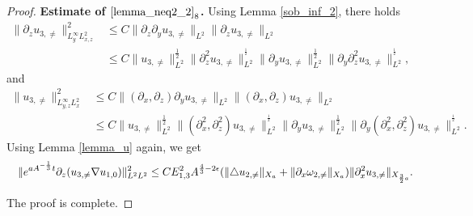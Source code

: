 \documentclass[12pt, reqno]{amsart}
\numberwithin{equation}{section}
\begin{document}
\begin{proof}
		{\bf Estimate of $\eqref{lemma_neq2_2}_8$.}
		Using Lemma \ref{sob_inf_2}, there holds
		\begin{equation*}
			\begin{aligned}
				\|\partial_zu_{3,\neq}\|^2_{L^{\infty}_yL^2_{x,z}}
				&\leq C\|\partial_z\partial_yu_{3,\neq}\|_{L^2}
				\|\partial_zu_{3,\neq}\|_{L^2}\\
				&\leq C
				\|u_{3,\neq}\|^{\frac12}_{L^2}
				\|\partial_z^2u_{3,\neq}\|^{^\frac12}_{L^2}
				\|\partial_yu_{3,\neq}\|^{\frac12}_{L^2}
				\|\partial_y\partial_z^2u_{3,\neq}\|
				^{^\frac12}_{L^2},
			\end{aligned}
		\end{equation*}
		and 
		\begin{equation*}
			\begin{aligned}
				\|u_{3,\neq}\|^2_{L^{\infty}_{y,z}L^2_x}
				&\leq C\|(\partial_x,\partial_z)\partial_yu_{3,\neq}\|_{L^2}
				\|(\partial_x,\partial_z)u_{3,\neq}\|_{L^2}\\
				&\leq C
				\|u_{3,\neq}\|^{\frac12}_{L^2}
				\|(\partial_x^2,\partial_z^2)u_{3,\neq}\|^{^\frac12}_{L^2}
				\|\partial_yu_{3,\neq}\|^{\frac12}_{L^2}
				\|\partial_y(\partial_x^2,\partial_z^2)u_{3,\neq}\|
				^{^\frac12}_{L^2}.
			\end{aligned}
		\end{equation*}
		Using  Lemma \ref{lemma_u} again, we get
		\begin{equation*}
			\begin{aligned}
				\quad\|{\rm e}^{aA^{-\frac{1}{3}}t}\partial_z
				(u_{3,\neq}\nabla u_{1,0} )\|^2_{L^2L^2}
				\leq CE_{1,3}^2A^{\frac43-2\epsilon}
				(\|\triangle u_{2,\neq}\|_{X_a}
				+\|\partial_x \omega_{2,\neq}\|_{X_a})
				\|\partial_x^2u_{3,\neq}\|_{X_{\frac32a}}.
			\end{aligned}
		\end{equation*}
		
		The proof is complete.
	\end{proof}
	
\end{document}
